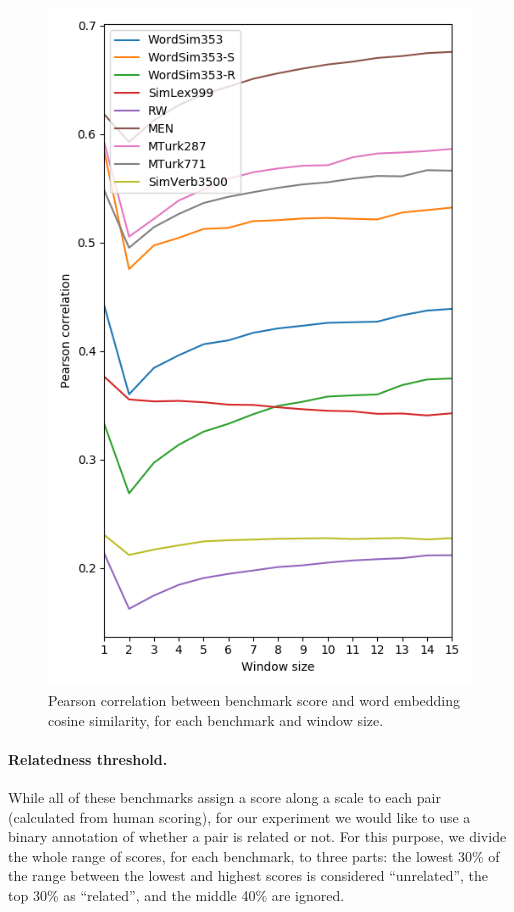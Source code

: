 \documentclass[11pt,a4paper]{article}
\begin{document}
    \begin{figure}[ht]
        \includegraphics[width=\columnwidth]{figs/similarities_fasttext_enwiki-20170501-clean_cbow-300d-min500_eval.png}
	    \caption{Pearson correlation between benchmark score and word embedding cosine similarity,
	    for each benchmark and window size.
	    \label{fig:benchmark_correlation}}
	\end{figure}

    \paragraph{Relatedness threshold.}
    
    While all of these benchmarks assign a score along a scale to each pair
    (calculated from human scoring), for our experiment we would like to use
    a binary annotation of whether a pair is related or not.
    For this purpose, we divide the whole range of scores,
    for each benchmark, to three parts:
    the lowest 30\% of the range between the lowest and highest scores
    is considered ``unrelated'', the top 30\% as ``related'',
    and the middle 40\% are ignored.
    
\end{document}
